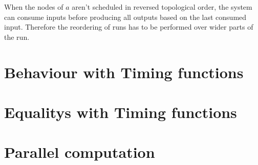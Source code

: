When the nodes of \(a\) aren't scheduled in reversed topological order, the system can consume inputs before producing all outputs based on the last consumed input.
Therefore the reordering of runs has to be performed over wider parts of the run.

\section{Behaviour with Timing functions}
\label{sec:behaviours:with_timing}
\section{Equalitys with Timing functions}
\label{sec:behaviours:with_timing}
\section{Parallel computation}
